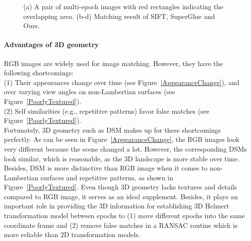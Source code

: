 \begin{figure}[htbp]
\begin{center}
{\begin{minipage}[t]{0.45\linewidth}
	\end{minipage}%
}
		\caption{(a) A pair of multi-epoch images with red rectangles indicating the overlapping area. (b-d) Matching result of SIFT, SuperGlue and Ours.}
		\label{MultiEpochImgPair}
	\end{center}
\end{figure}

\paragraph{Advantages of 3D geometry}
RGB images are widely used for image matching. However, they have the following shortcomings:\\
(1) Their appearances change over time (see Figure~\ref{AppearanceChange}), and over varying view angles on non-Lambertian surfaces (see Figure~\ref{PoorlyTextured}).\\
(2) Self similarities (e.g., repetitive patterns) favor false matches (see Figure~\ref{PoorlyTextured}).\\
Fortunately, 3D geometry such as \ac{DSM} makes up for these shortcomings perfectly. As can be seen in Figure~\ref{AppearanceChange}, the RGB images look very different because the scene changed a lot. However, the corresponding \ac{DSM}s look similar, which is reasonable, as the 3D landscape is more stable over time. Besides, \ac{DSM} is more distinctive than RGB image when it comes to non-Lambertian surfaces and repetitive patterns, as shown in Figure~\ref{PoorlyTextured}. 
Even though 3D geometry lacks textures and details compared to RGB image, it serves as an ideal supplement. Besides, it plays an important role in providing the 3D information for establishing 3D Helmert transformation model between epochs to (1) move different epochs into the same coordinate frame and (2) remove false matches in a RANSAC routine which is more reliable than 2D transformation models.

